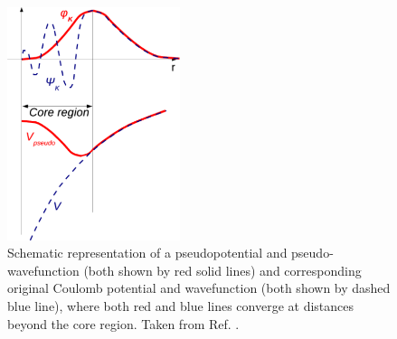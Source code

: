\documentclass[11pt, twoside]{report}
\begin{document}
\begin{figure}[h!]
  \centering
    \includegraphics[width=0.45\textwidth]{figures/PP.png}
    \caption{Schematic representation of a pseudopotential and pseudo-wavefunction (both shown by red solid lines) and corresponding original Coulomb potential and wavefunction (both shown by dashed blue line), where both red and blue lines converge at distances beyond the core region. Taken from Ref. .}
  \label{PP}
\end{figure}
\end{document}
